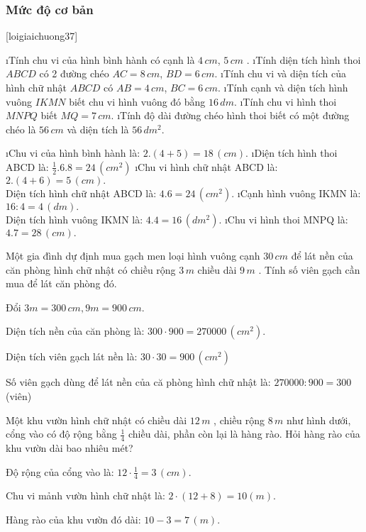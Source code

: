 \subsubsection*{Mức độ cơ bản}
[loigiaichuong37]
\begin{bt}
	\begin{enumerate}[a), leftmargin=*]
		\i Tính chu vi của hình bình hành có cạnh là  $4\,cm$, $5\,cm$ .
		\i Tính diện tích hình thoi  $ABCD$  có 2 đường chéo $AC=8 \,cm$, $BD=6 \,cm$. 
		\i Tính chu vi và diện tích của hình chữ nhật  $ABCD$  có  $AB=4\,cm$, $BC=6\, cm$. 
		\i Tính cạnh và diện tích hình vuông $IKMN$ biết chu vi hình vuông đó bằng  $16 \,dm$. 
		\i Tính chu vi hình thoi  $MNPQ$ biết  $MQ=7\,cm$. 
		\i Tính độ dài đường chéo hình thoi biết có một đường chéo là  $56\,cm$ và diện tích là  $56 \,dm^2$.
	\end{enumerate}
	\begin{loigiaichuong37}
		\begin{enumerate}[a), leftmargin=*]
			\i Chu vi của hình bình hành là:  $2.(4+5)=18 \,(cm).$ 
			\i Diện tích hình thoi ABCD là:  $\frac{1}{2}.6.8=24\, (cm^2)$ 
			\i Chu vi hình chữ nhật ABCD là:  $2.(4+6)=5 \,(cm).$\\
			Diện tích hình chữ nhật ABCD là:  $4.6=24\,(cm^2).$ 
			\i Cạnh hình vuông IKMN là:  $16:4=4\,(dm).$\\ 
			Diện tích hình vuông IKMN là:  $4.4=16\,(dm^2).$ 
			\i Chu vi hình thoi MNPQ là:  $4.7=28\,(cm).$ 
		\end{enumerate}
	\end{loigiaichuong37}
\end{bt}
\begin{bt}
	Một gia đình dự định mua gạch men loại hình vuông cạnh  $30\, cm$  để lát nền của căn phòng hình chữ nhật có chiều rộng  $3\, m$  chiều dài  $9\, m$ . Tính số viên gạch cần mua để lát căn phòng đó.
	\begin{loigiaichuong37}
		Đổi  $3m=300\,cm,9m=900\,cm.$
		 
		Diện tích nền của căn phòng là:  $300\cdot900=270000\,(cm^2).$
		 
		Diện tích viên gạch lát nền là:  $30\cdot30=900\,(cm^2)$
		 
		Số viên gạch dùng để lát nền của că phòng hình chữ nhật là:  $270000:900=300$  (viên)
	\end{loigiaichuong37}
\end{bt}
\begin{bt}
	Một khu vườn hình chữ nhật có chiều dài  $12 \,m$ , chiều rộng  $8\, m$  như hình dưới, cổng vào có độ rộng bằng  $\frac{1}{4}$ chiều dài, phần còn lại là hàng rào. Hỏi hàng rào của khu vườn dài bao nhiêu mét?
	\begin{loigiaichuong37}
		Độ rộng của cổng vào là:  $12\cdot\frac{1}{4}=3 \,(cm).$
		
		Chu vi mảnh vườn hình chữ nhật là:  $2\cdot(12+8)=10 (m).$ 
		
		Hàng rào của khu vườn đó dài:  $10-3=7 \,(m).$ 
	\end{loigiaichuong37}
\end{bt}
